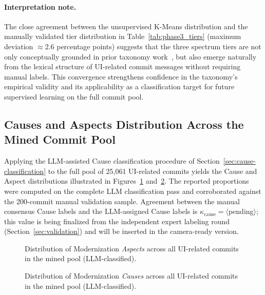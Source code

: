 \documentclass{article}
\begin{document}
\paragraph{Interpretation note.}
The close agreement between the unsupervised K-Means distribution
and the manually validated tier distribution in
Table~\ref{tab:phase3_tiers} (maximum deviation $\approx$2.6
percentage points) suggests that the three spectrum tiers are not
only conceptually grounded in prior taxonomy
work~\cite{lamine2022understanding}, but also emerge naturally from
the lexical structure of UI-related commit messages without requiring
manual labels. This convergence strengthens confidence in the
taxonomy's empirical validity and its applicability as a
classification target for future supervised learning on the full
commit pool.

\subsection{Causes and Aspects Distribution Across the Mined Commit Pool}
\label{sec:cause-results}

Applying the LLM-assisted Cause classification procedure of
Section~\ref{sec:cause-classification} to the full pool of 25,061
UI-related commits yields the Cause and Aspect distributions
illustrated in Figures~\ref{fig:aspects-full}
and~\ref{fig:causes-full}. The reported proportions were computed on the
complete LLM classification pass and corroborated against the 200-commit
manual validation sample. Agreement between the manual consensus Cause
labels and the LLM-assigned Cause labels is
$\kappa_{\text{cause}} = \langle$pending$\rangle$; this value is being
finalized from the independent expert labeling round
(Section~\ref{sec:validation}) and will be inserted in the camera-ready
version.

\begin{figure}[htbp]
\centering
{}
\caption{Distribution of Modernization \emph{Aspects} across all
UI-related commits in the mined pool (LLM-classified).}
\label{fig:aspects-full}
\end{figure}

\begin{figure}[htbp]
\centering
{}
\caption{Distribution of Modernization \emph{Causes} across all
UI-related commits in the mined pool (LLM-classified).}
\label{fig:causes-full}
\end{figure}
\end{document}
